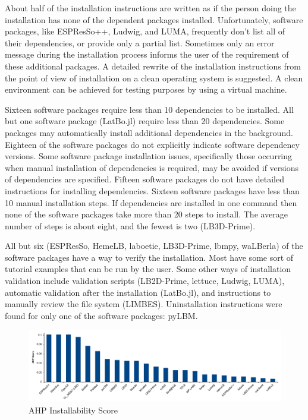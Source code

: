 \documentclass[final, 3p, times, authoryear]{elsarticle}
\begin{document}
About half of the installation instructions are written as if the person doing
the installation has none of the dependent packages installed. Unfortunately,
software packages, like ESPResSo++, Ludwig, and LUMA, frequently don't list all
of their dependencies, or provide only a partial list. Sometimes only an error
message during the installation process informs the user of the requirement of
these additional packages. A detailed rewrite of the installation instructions
from the point of view of installation on a clean operating system is suggested.
A clean environment can be achieved for testing purposes by using a virtual
machine.

Sixteen software packages require less than 10 dependencies to be installed. All
but one software package (LatBo.jl) require less than 20 dependencies. Some
packages may automatically install additional dependencies in the background.
Eighteen of the software packages do not explicitly indicate software dependency
versions. Some software package installation issues, specifically those
occurring when manual installation of dependencies is required, may be avoided
if versions of dependencies are specified. Fifteen software packages do not have
detailed instructions for installing dependencies. Sixteen software packages
have less than 10 manual installation steps. If dependencies are installed in
one command then none of the software packages take more than 20 steps to
install. The average number of steps is about eight, and the fewest is two
(LB3D-Prime). 

All but six (ESPResSo, HemeLB, laboetie, LB3D-Prime, lbmpy, waLBerla) of the
software packages have a way to verify the installation. Most have some sort of
tutorial examples that can be run by the user. Some other ways of installation
validation include validation scripts (LB2D-Prime, lettuce, Ludwig, LUMA),
automatic validation after the installation (LatBo.jl), and instructions to
manually review the file system (LIMBES).  Uninstallation instructions were
found for only one of the software packages: pyLBM.

\begin{figure}[h!]
	\begin{center}
		\includegraphics[width=1.0\textwidth]{./figures/installability_chart.pdf}
		\caption{AHP Installability Score}
		\label{Fig_Installability}
	\end{center}
\end{figure}
\end{document}
